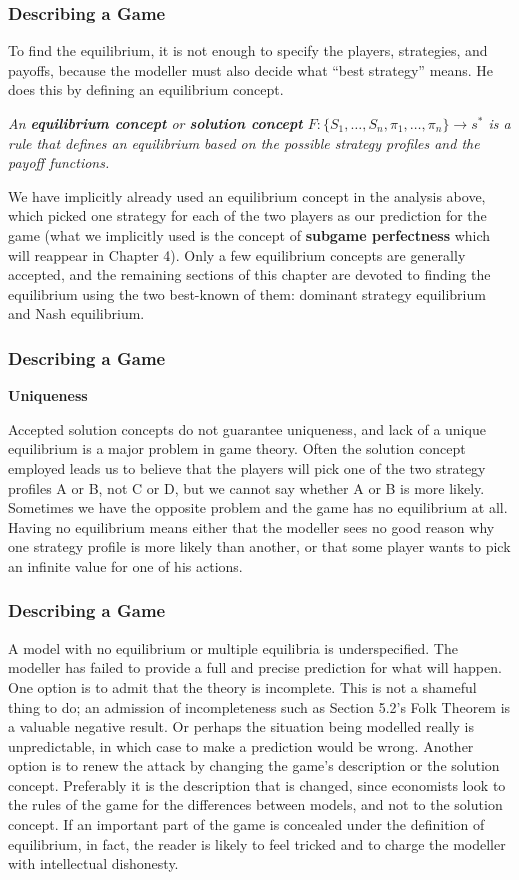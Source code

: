  \begin{frame}[fragile]\frametitle{Describing a Game}
To find the equilibrium,  it is not enough to specify the players, strategies,
and payoffs, because the modeller must also decide what ``best strategy'' means.
He does this by defining an equilibrium concept.

 {\it An {\bf equilibrium concept} or {\bf solution concept} $F:
\{S_1,\ldots, S_n,\pi_1,\ldots,\pi_n \} \rightarrow s^*$ is a rule that defines
an equilibrium based on the possible strategy profiles and the payoff
functions.}

  We have implicitly already used an equilibrium concept in the
analysis above, which picked one strategy for each of the two players as our
prediction for the game (what we implicitly used is the concept of {\bf subgame
perfectness} which will reappear in Chapter 4).  Only a few equilibrium concepts
are generally accepted, and the remaining sections of this chapter are devoted
to finding the equilibrium using the two best-known of them: dominant strategy
equilibrium
and Nash equilibrium.

\end{frame}
 \begin{frame}[fragile]\frametitle{Describing a Game}
  {\bf Uniqueness}

  Accepted solution concepts do not guarantee uniqueness, and lack of a
unique equilibrium is a major problem in game theory. Often the solution concept
employed leads us to believe that the players will pick one of the two strategy
profiles A or B, not C or D, but we cannot say whether A or B is more likely.
Sometimes we have the opposite problem and the game has no equilibrium at all.
Having no equilibrium means either that the modeller sees no good reason why one
strategy profile is more likely than another, or that some player wants to pick
an infinite value for one of his actions.

\end{frame}
 \begin{frame}[fragile]\frametitle{Describing a Game}
 
  A model with no equilibrium or multiple equilibria is underspecified. The
modeller has failed to provide a full and precise prediction for what will
happen.  One option is to admit that the theory is incomplete. This is not a
shameful thing to do; an admission of incompleteness such as Section 5.2's  Folk
Theorem is a valuable negative result. Or perhaps the situation being modelled
really is unpredictable, in which case to make a prediction would be wrong.
Another option is to renew the attack by changing the game's description or the
solution concept. Preferably it is the description that is changed, since
economists look to the rules of the game for the differences between models, and
not to the solution concept. If an important part of the game is concealed under
the definition of equilibrium, in fact, the reader is likely to feel tricked and
to charge the modeller with intellectual dishonesty.

\end{frame}
